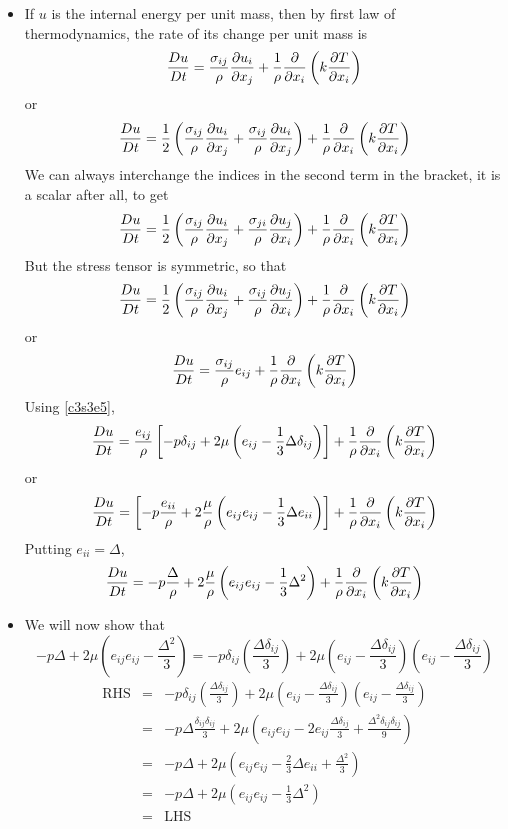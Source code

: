 \begin{itemize}
\item If $u$ is the internal energy per unit mass, then by first law of thermodynamics, the rate of its change per unit mass is
\begin{equation}\label{c3s4e3a}
\frac{D{u}}{Dt} = \frac{\sigma_{ij}}{\rho}\frac{\partial{u_i}}{\partial{x_j}} + \frac{1}{\rho}\frac{\partial}{\partial x_i}\left(k\frac{\partial{T}}{\partial{x_i}}\right)
\end{equation}
or
\[
\frac{D{u}}{Dt} = \frac{1}{2}\left(\frac{\sigma_{ij}}{\rho}\frac{\partial{u_i}}{\partial{x_j}} + \frac{\sigma_{ij}}{\rho}\frac{\partial{u_i}}{\partial{x_j}}\right) + \frac{1}{\rho}\frac{\partial}{\partial x_i}\left(k\frac{\partial{T}}{\partial{x_i}}\right)
\]
We can always interchange the indices in the second term in the bracket, it is a scalar after all, to get
\[
\frac{D{u}}{Dt} = \frac{1}{2}\left(\frac{\sigma_{ij}}{\rho}\frac{\partial{u_i}}{\partial{x_j}} + \frac{\sigma_{ji}}{\rho}\frac{\partial{u_j}}{\partial{x_i}}\right) + \frac{1}{\rho}\frac{\partial}{\partial x_i}\left(k\frac{\partial{T}}{\partial{x_i}}\right)
\]
But the stress tensor is symmetric, so that
\[
\frac{D{u}}{Dt} = \frac{1}{2}\left(\frac{\sigma_{ij}}{\rho}\frac{\partial{u_i}}{\partial{x_j}} + \frac{\sigma_{ij}}{\rho}\frac{\partial{u_j}}{\partial{x_i}}\right) + \frac{1}{\rho}\frac{\partial}{\partial x_i}\left(k\frac{\partial{T}}{\partial{x_i}}\right)
\]
or
\begin{equation}\label{c3s4e4}
\frac{D{u}}{Dt} = \frac{\sigma_{ij}}{\rho}e_{ij} + \frac{1}{\rho}\frac{\partial}{\partial x_i}\left(k\frac{\partial{T}}{\partial{x_i}}\right)
\end{equation}
Using \eqref{c3s3e5},
\[
\frac{D{u}}{Dt} = \frac{e_{ij}}{\rho}\left[-p\delta_{ij} + 2\mu\left(e_{ij} -\frac{1}{3}\Delta\delta_{ij}\right)\right] + \frac{1}{\rho}\frac{\partial}{\partial x_i}\left(k\frac{\partial{T}}{\partial{x_i}}\right)
\]
or
\[
\frac{D{u}}{Dt} = \left[-p\frac{e_{ii}}{\rho} + 2\frac{\mu}{\rho}\left(e_{ij}e_{ij} -\frac{1}{3}\Delta e_{ii}\right)\right] + \frac{1}{\rho}\frac{\partial}{\partial x_i}\left(k\frac{\partial{T}}{\partial{x_i}}\right)
\]
Putting $e_{ii} = \Delta$,
\begin{equation}\label{c3s4e5}
\frac{D{u}}{Dt} = -p\frac{\Delta}{\rho} + 2\frac{\mu}{\rho}\left(e_{ij}e_{ij} -\frac{1}{3}\Delta^2\right) + \frac{1}{\rho}\frac{\partial}{\partial x_i}\left(k\frac{\partial{T}}{\partial{x_i}}\right)
\end{equation}

\item We will now show that
\[
-p\Delta + 2\mu\left(e_{ij}e_{ij} - \frac{\Delta^2}{3}\right) = -p\delta_{ij}\left(\frac{\Delta\delta_{ij}}{3}\right) + 
2\mu\left(e_{ij} - \frac{\Delta\delta_{ij}}{3}\right)\left(e_{ij} - \frac{\Delta\delta_{ij}}{3}\right)
\]
\begin{eqnarray*}
\text{RHS} &=& -p\delta_{ij}\left(\frac{\Delta\delta_{ij}}{3}\right) + 2\mu\left(e_{ij} - \frac{\Delta\delta_{ij}}{3}\right)\left(e_{ij} - \frac{\Delta\delta_{ij}}{3}\right) \\
 &=& -p\Delta\frac{\delta_{ij}\delta_{ij}}{3} + 2\mu\left(e_{ij}e_{ij} - 2e_{ij}\frac{\Delta\delta_{ij}}{3} + \frac{\Delta^2\delta_{ij}\delta_{ij}}{9}\right) \\
 &=& -p\Delta + 2\mu\left(e_{ij}e_{ij} - \frac{2}{3}\Delta e_{ii} + \frac{\Delta^2}{3}\right) \\
 &=& -p\Delta + 2\mu\left(e_{ij}e_{ij} - \frac{1}{3}\Delta^2\right) \\
 &=& \text{LHS}
\end{eqnarray*}


\end{itemize}
